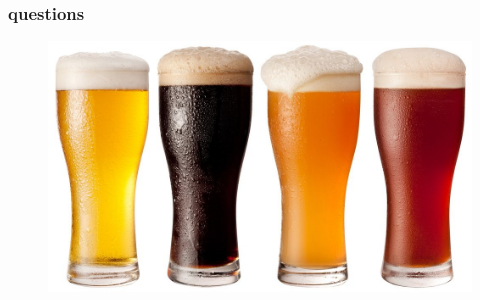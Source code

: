 \documentclass{beamer}
\begin{document}
\begin{frame}
	\frametitle{questions}
	\begin{figure}
	\centering
	\includegraphics[scale=1]{figs/beer}
	\end{figure}
	
\end{frame}






\end{document}
